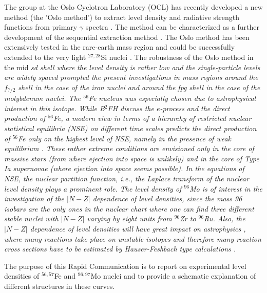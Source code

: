 \begin{multicols}{2}

The group at the Oslo Cyclotron Laboratory (OCL) has recently developed a new 
method (the 'Oslo method') to extract level density and radiative strength 
functions from primary $\gamma$ spectra \cite{SB00}. The method can be 
characterized as a further development of the sequential extraction method 
\cite{BB70,BE73}. The Oslo method has been extensively tested in the rare-earth
mass region \cite{SB01,MG01,VG01,SG02} and could be successfully extended to 
the very light $^{27,28}$Si nuclei \cite{GM02}. The robustness of the Oslo 
method in the mid \it sd \rm shell where the level density is rather low and 
the single-particle levels are widely spaced prompted the present 
investigations in mass regions around the $f_{7/2}$ shell in the case of the 
iron nuclei and around the \it fpg \rm shell in the case of the molybdenum 
nuclei. The $^{56}$Fe nucleus was especially chosen due to astrophysical 
interest in this isotope. While B$^2$FH \cite{BB57} discuss the $e$-process and
the direct production of $^{56}$Fe, a modern view in terms of a hierarchy of 
restricted nuclear statistical equilibria (NSE) on different time scales 
predicts the direct production of $^{56}$Fe only on the highest level of NSE, 
namely in the presence of weak equilibrium \cite{WI97}. These rather extreme 
conditions are envisioned only in the core of massive stars (from where 
ejection into space is unlikely) and in the core of Type Ia supernovae (where 
ejection into space seems possible). In the equations of NSE, the nuclear 
partition function, i.e., the Laplace transform of the nuclear level density 
plays a prominent role. The level density of $^{96}$Mo is of interest in the 
investigation of the $|N-Z|$ dependence of level densities, since the mass 96 
isobars are the only ones in the nuclear chart where one can find three 
different stable nuclei with $|N-Z|$ varying by eight units from $^{96}$Zr to 
$^{96}$Ru. Also, the $|N-Z|$ dependence of level densities will have great 
impact on astrophysics \cite{AG01}, where many reactions take place on unstable
isotopes and therefore many reaction cross sections have to be estimated by 
Hauser-Feshbach type calculations \cite{HF52}.

The purpose of this Rapid Communication is to report on experimental level
densities of $^{56,57}$Fe and $^{96,97}$Mo nuclei and to provide a schematic 
explanation of different structures in these curves.


\end{multicols}
